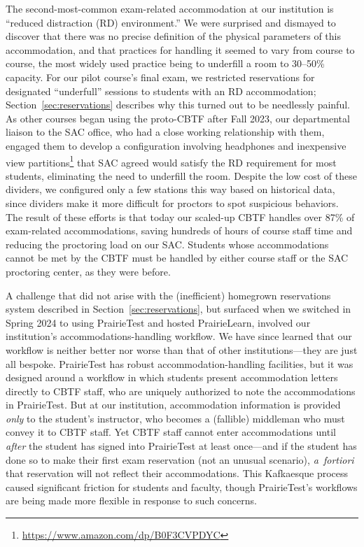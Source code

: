 The second-most-common exam-related accommodation at our institution
is ``reduced distraction (RD) environment.''
We were surprised and dismayed to discover that there was no precise definition
of the physical parameters of this accommodation, and
that practices for handling it seemed to vary
from course to course, the most widely used practice being to
underfill a room to 30--50\% capacity.
For our pilot course's final exam, we
restricted reservations for designated ``underfull'' sessions to students with
an RD accommodation; Section~\ref{sec:reservations} describes why this turned
out to be needlessly painful.
As other courses began using the proto-CBTF after Fall 2023,
our departmental liaison to
the SAC office, who had a close working relationship with them,
engaged them
to develop
a configuration involving headphones and inexpensive view
partitions\footnote{\url{https://www.amazon.com/dp/B0F3CVPDYC}} that
SAC agreed would satisfy the RD requirement for most
students, eliminating the need to underfill the room.
Despite the low cost of these dividers, we configured only a few stations
this way based on historical data,
since dividers make it more
difficult for proctors to spot suspicious behaviors.
The result of these efforts
is that today our scaled-up CBTF handles over 87\%  of
exam-related accommodations, saving hundreds of hours of course staff
time and reducing the proctoring load on our SAC.  Students
whose accommodations cannot be met by the CBTF must
be handled by either course staff or the SAC proctoring center, as
they were before.

A challenge that did not arise with the (inefficient) homegrown
reservations system described in Section~\ref{sec:reservations}, but surfaced when we switched in Spring 2024 to
using PrairieTest and hosted PrairieLearn,
involved our institution's accommodations-handling
workflow.  We have since learned that our workflow is neither better nor worse than
that of other institutions---they are just all bespoke.
PrairieTest has robust accommodation-handling facilities,
but it was designed around a workflow in which students
present accommodation letters directly
to CBTF staff, who are uniquely authorized to
note the
accommodations in PrairieTest.
But at our institution,
accommodation information is provided \emph{only\/} to
the student's instructor, who becomes a (fallible) middleman who must convey it to CBTF
staff.
Yet CBTF staff cannot enter accommodations until
\emph{after\/} the student has signed into PrairieTest at least once---and if the 
student has done so to make their first exam
reservation (not an unusual scenario), \emph{a~fortiori\/} that reservation will not reflect
their accommodations.
This Kafkaesque process caused significant friction for students and
faculty, though PrairieTest's workflows are being made more flexible
in response to such concerns.
